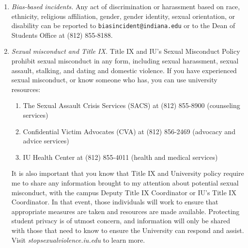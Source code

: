 \documentclass[11pt,article,oneside]{memoir} %
\begin{document}
\begin{enumerate}
\item \emph{Bias-based incidents.} Any act of discrimination or harassment based on 
race, ethnicity, religious affiliation, gender, gender identity, sexual orientation, or
disability can be reported to \texttt{biasincident@indiana.edu} or to the Dean of Students Office at (812) 855-8188. 

\item \emph{Sexual misconduct and Title IX.} 
Title IX and IU's Sexual Misconduct Policy prohibit sexual misconduct in any
form, including sexual harassment, sexual assault, stalking, and dating and
domestic violence.  If you have experienced sexual misconduct, or know someone
who has, you can use university resources:  

\begin{enumerate}
    
\item The Sexual Assault Crisis Services (SACS) at (812) 855-8900 (counseling services)
\item Confidential Victim Advocates (CVA) at (812) 856-2469 (advocacy and advice services)
\item IU Health Center at (812) 855-4011 (health and medical services)

\end{enumerate}

It is also important that you know that Title IX and University policy require me to share any information brought to my attention about potential sexual misconduct, with the campus Deputy Title IX Coordinator or IU's Title IX Coordinator. 
In that event, those individuals will work to ensure that appropriate measures are taken and resources are made available. 
Protecting student privacy is of utmost concern, and information will only be shared with those that need to know to ensure the University can respond and assist. 
Visit \emph{stopsexualviolence.iu.edu} to learn more. 



\end{enumerate}
\end{document}

